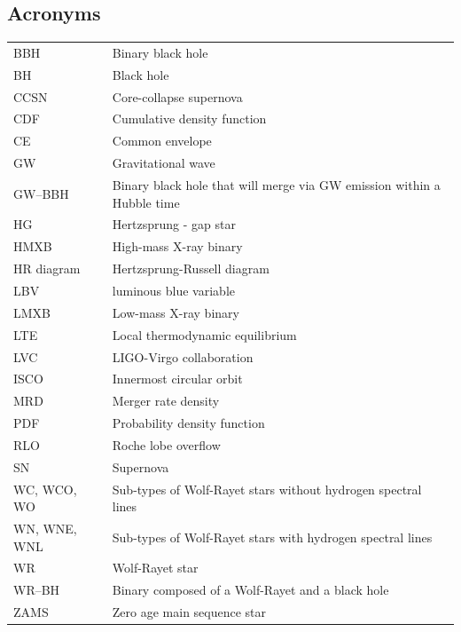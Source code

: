 \documentclass[a4paper,titlepage]{book}     	%
\begin{document}
\begin{appendices}
\chapter{Acronyms}
\begin{tabular}{ll}
BBH & Binary black hole \\
BH & Black hole \\
CCSN & Core-collapse supernova \\
CDF & Cumulative density function \\
CE & Common envelope \\
GW  & Gravitational wave \\
GW--BBH & Binary black hole that will merge via GW emission within a Hubble time \\
HG & Hertzsprung - gap star\\
HMXB & High-mass X-ray binary \\
HR diagram & Hertzsprung-Russell diagram\\
LBV & luminous blue variable \\
LMXB & Low-mass X-ray binary \\
LTE & Local thermodynamic equilibrium \\
LVC & LIGO-Virgo collaboration \\
ISCO & Innermost circular orbit \\
MRD & Merger rate density \\
PDF & Probability density function \\
RLO & Roche lobe overflow \\
SN & Supernova \\
WC, WCO,  WO & Sub-types of Wolf-Rayet stars without hydrogen spectral lines \\
WN, WNE, WNL & Sub-types of Wolf-Rayet stars with hydrogen spectral lines \\
WR & Wolf-Rayet star \\
WR--BH & Binary composed of a Wolf-Rayet and a black hole \\
ZAMS & Zero age main sequence star \\

\end{tabular}
\end{appendices}



\printbibliography[heading=bibintoc]
\end{document}
